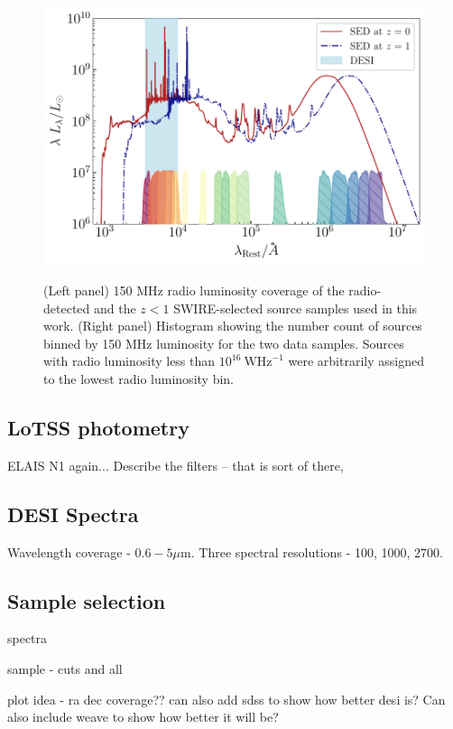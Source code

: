 \documentclass[fleqn,usenatbib]{mnras}
\begin{document}
\begin{figure}
  {\includegraphics[width=1\columnwidth]{figures/data_coverage.pdf}}
    \caption{(Left panel) 150 MHz radio luminosity coverage of the radio-detected and the $z < 1$ SWIRE-selected source samples used in this work. (Right panel) Histogram showing the number count of sources binned by 150 MHz luminosity for the two data samples. Sources with radio luminosity less than $10^{16}~\mathrm{WHz}^{-1}$ were arbitrarily assigned to the lowest radio luminosity bin.}
    \label{fig:filters_jwst_hst}
\end{figure}

\subsection{LoTSS photometry}
ELAIS N1 again...
Describe the filters -- that is sort of there, 

\subsection{DESI Spectra}
Wavelength coverage  - $0.6-5\mu\mathrm{m}$. Three spectral resolutions  - 100, 1000, 2700.

\subsection{Sample selection}
spectra

sample - cuts and all

plot idea - ra dec coverage?? can also add sdss to show how better desi is? Can also include weave to show how better it will be?
\end{document}

